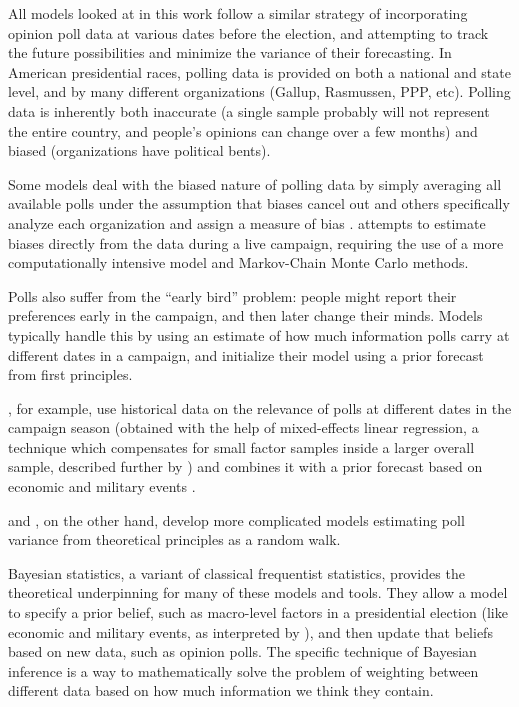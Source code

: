 \documentclass[12pt]{report}
\begin{document}
All models looked at in this work follow a similar strategy of incorporating opinion poll data at various dates before the election, and attempting to track the future possibilities and minimize the variance of their forecasting. In American presidential races, polling data is provided on both a national and state level, and by many different organizations (Gallup, Rasmussen, PPP, etc). Polling data is inherently both inaccurate (a single sample probably will not represent the entire country, and people's opinions can change over a few months) and biased (organizations have political bents).

Some models deal with the biased nature of polling data by simply averaging all available polls under the assumption that biases cancel out \citep{Wang:2012aa} and others specifically analyze each organization and assign a measure of bias \citep{Silver:2012aa}. \citet{Strauss:2007aa} attempts to estimate biases directly from the data during a live campaign, requiring the use of a more computationally intensive model and Markov-Chain Monte Carlo methods.

Polls also suffer from the ``early bird'' problem: people might report their preferences early in the campaign, and then later change their minds. Models typically handle this by using an estimate of how much information polls carry at different dates in a campaign, and initialize their model using a prior forecast from first principles.

\citet{Lock:2010aa}, for example, use historical data on the relevance of polls at different dates in the campaign season (obtained with the help of mixed-effects linear regression, a technique which compensates for small factor samples inside a larger overall sample, described further by \citealt{Gelman:2006aa}) and combines it with a prior forecast based on economic and military events \citep{Hibbs:2008aa}.

\citet{Strauss:2007aa} and \citet{Jackman:2005aa}, on the other hand, develop more complicated models estimating poll variance from theoretical principles as a random walk.

Bayesian statistics, a variant of classical frequentist statistics, provides the theoretical underpinning for many of these models and tools. They allow a model to specify a prior belief, such as macro-level factors in a presidential election (like economic and military events, as interpreted by \citealt{Hibbs:2008aa}), and then update that beliefs based on new data, such as opinion polls. The specific technique of Bayesian inference is a way to mathematically solve the problem of weighting between different data based on how much information we think they contain.
\end{document}
